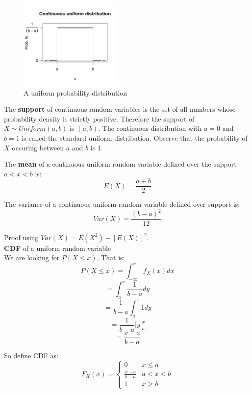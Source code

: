 \begin{figure}[H]
\centering
\includegraphics[width=0.45\textwidth]{images/cont_uniform_dist.png}
\caption{A uniform probability distribution}
\label{fig:sample}
\end{figure}

The \textbf{support} of continuous random variables is the set of all numbers whose probability density is strictly positive. Therefore the support of $X \sim Uniform(a,b)$ is $(a,b)$. The continuous distribution with $a = 0$ and $b = 1$ is called the standard uniform distribution. Observe that the probability of $X$ occuring between $a$ and $b$ is 1.

The \textbf{mean} of a continuous uniform random variable defined over the support $a < x < b$ is:
$$E(X) = \frac{a+b}{2}$$


The variance of a continuous uniform random variable defined over support is:
$$Var(X) = \frac{(b-a)^2}{12}$$

Proof using $Var(X) = E(X^2) - [E(X)]^2$.\\

\textbf{CDF} of a uniform random variable\\

We are looking for $P(X \le x)$. That is:
$$P(X \le x) = \int_{-\infty}^{x} f_X (x) dx$$
$$= \int_{a}^{x} \frac{1}{b-a} dy$$
$$=\frac{1}{b-a} \int_{a}^{x} 1 dy$$
$$= \frac{1}{b-a} | y |_{a}^{x}$$
$$=\frac{x-a}{b-a}$$

So define CDF as:
\begin{equation}
    F_X (x) = 
    \begin{cases}
        0 & x \le a\\
        \frac{x-a}{b-a} & a < x < b\\
        1 & x \ge b
    \end{cases}
\end{equation}

